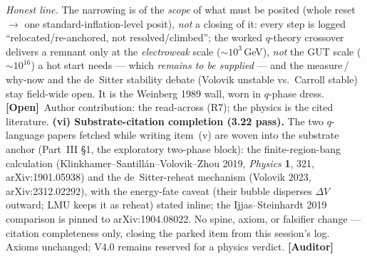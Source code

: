 \documentclass[11pt]{article}
\newcommand{\Auditor}{\textbf{\textcolor{teal!55!black}{[Auditor]}}}
\newcommand{\open}{\textcolor{red!70!black}{\textbf{[Open]}}}
\begin{document}
{\emph{Honest line.} The narrowing is of the \emph{scope} of what must be posited (whole reset $\to$ one standard-inflation-level posit), \emph{not} a closing of it: every step is logged ``relocated/re-anchored, not resolved/climbed''; the worked $q$-theory crossover delivers a remnant only at the \emph{electroweak} scale ($\sim\!10^{3}$\,GeV), \emph{not} the GUT scale ($\sim\!10^{16}$) a hot start needs --- which \emph{remains to be supplied} --- and the measure\,/\,why-now and the de~Sitter stability debate (Volovik unstable vs.\ Carroll stable) stay field-wide open. It is the Weinberg 1989 wall, worn in $q$-phase dress. \open\ Author contribution: the read-across (R7); the physics is the cited literature. \textbf{(vi) Substrate-citation completion (3.22 pass).} The two $q$-language papers fetched while writing item~(v) are woven into the substrate anchor (Part~III \S1, the exploratory two-phase block): the finite-region-bang calculation (Klinkhamer--Santill\'an--Volovik--Zhou 2019, \emph{Physics} \textbf{1}, 321, arXiv:1901.05938) and the de~Sitter-reheat mechanism (Volovik 2023, arXiv:2312.02292), with the energy-fate caveat (their bubble disperses $\Delta V$ outward; LMU keeps it as reheat) stated inline; the Ijjas--Steinhardt 2019 comparison is pinned to arXiv:1904.08022. No spine, axiom, or falsifier change --- citation completeness only, closing the parked item from this session's log. Axioms unchanged; V4.0 remains reserved for a physics verdict. \Auditor

}
\end{document}
